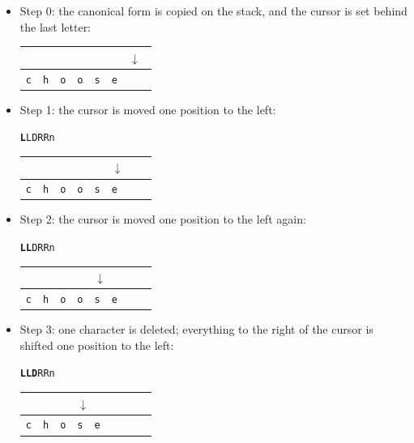\begin{itemize}
  \item Step 0: the canonical form is copied on the stack, and the cursor is set behind the last letter:
  
  \begin{center}
\begin{tabular}{|l|l|l|l|l|l|l|l}
\multicolumn{6}{l}{} & \multicolumn{2}{l}{$\downarrow$} \\
\hline
\verb+c+ & \verb+h+ & \verb+o+ & \verb+o+ & \verb+s+ & \verb+e+ & \verb+ + & \\
\hline
\end{tabular}
\end{center}

\bigskip
\item Step 1: the cursor is moved one position to the left:

\begin{center}
\texttt{\textbf{L}LDRRn}

\begin{tabular}{|l|l|l|l|l|l|l|l}
\multicolumn{5}{l}{} & \multicolumn{3}{l}{$\downarrow$} \\
\hline
\verb+c+ & \verb+h+ & \verb+o+ & \verb+o+ & \verb+s+ & \verb+e+ & \verb+ + & \\
\hline
\end{tabular}
\end{center}

\bigskip
\item Step 2: the cursor is moved one position to the left again:

\begin{center}
\texttt{\textbf{LL}DRRn}

\begin{tabular}{|l|l|l|l|l|l|l|l}
\multicolumn{4}{l}{} & \multicolumn{4}{l}{$\downarrow$} \\
\hline
\verb+c+ & \verb+h+ & \verb+o+ & \verb+o+ & \verb+s+ & \verb+e+ & \verb+ + & \\
\hline
\end{tabular}
\end{center}

\bigskip \item Step 3: one character is deleted; everything to the right of the
cursor is shifted one position to the left:

\begin{center}
\texttt{\textbf{LLD}RRn}

\begin{tabular}{|l|l|l|l|l|l|l|l}
\multicolumn{3}{l}{} & \multicolumn{5}{l}{$\downarrow$} \\
\hline
\verb+c+ & \verb+h+ & \verb+o+ & \verb+s+ & \verb+e+ & \verb+ + & \verb+ + & \\
\hline
\end{tabular}
\end{center}


\end{itemize}
